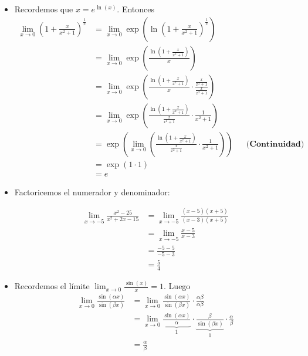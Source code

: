\documentclass[12pt]{book}
\begin{document}
\begin{itemize}
    \item[\textbf{a)}] Recordemos que $x = e^{\ln(x)}$. Entonces
    \begin{align*}
        \lim_{x\to 0} \left(1 + \frac{x}{x^2+1}\right)^{\frac{1}{x}} &=  \lim_{x\to 0}  \exp \left(\ln\left(1 + \frac{x}{x^2+1}\right)^{\frac{1}{x}} \right) \\
        &=\lim_{x\to 0} \exp \left(\frac{\ln\left(1 + \frac{x}{x^2+1}\right)}{x}\right) \\ 
        &=\lim_{x\to 0} \exp \left(\frac{\ln\left(1 + \frac{x}{x^2+1}\right)}{x} \cdot \frac{\frac{x}{x^2+1}}{\frac{x}{x^2+1}}\right) \\ 
        &= \lim_{x\to 0}  \exp \left(\frac{\ln\left(1 + \frac{x}{x^2+1}\right)}{\frac{x}{x^2+1}} \cdot \frac{1}{x^2+1}\right) \\
        &= \exp \left(\lim_{x\to 0}\left(\frac{\ln\left(1 + \frac{x}{x^2+1}\right)}{\frac{x}{x^2+1}} \cdot \frac{1}{x^2+1}\right) \right) && \textbf{(Continuidad)} \\
        &= \exp( 1\cdot 1) \\
        &=e
    \end{align*}

    \item[\textbf{b)}] Factoricemos el numerador y denominador:

    \begin{align*}
        \lim_{x\to -5 }\frac{x^2-25}{x^2+2x-15} &= \lim_{x \to -5}\frac{(x-5)(x+5)}{(x-3)(x+5)} \\
        &=\lim_{x \to -5}\frac{x-5}{x-3} \\
        &= \frac{-5-5}{-5-3} \\
        &=\frac{5}{4}
    \end{align*}

    \item[\textbf{c)}] Recordemos el límite $\displaystyle \lim_{x \to 0} \frac{\sin(x)}{x}=1$. Luego
    \begin{align*}
       \lim_{x \to 0} \frac{\sin(\alpha x )}{\sin(\beta x)}&=\lim_{x \to 0} \frac{\sin(\alpha x)}{\sin(\beta x )}\cdot \frac{\alpha \beta }{\alpha \beta} \\
       &= \lim_{x \to 0} \underbrace{\frac{\sin(\alpha x ) }{\alpha}}_{1} \cdot \underbrace{\frac{\beta }{\sin(\beta x )}}_{1} \cdot \frac{\alpha}{\beta} \\
       &= \frac{\alpha}{\beta}
    \end{align*}


\end{itemize}
\end{document}
